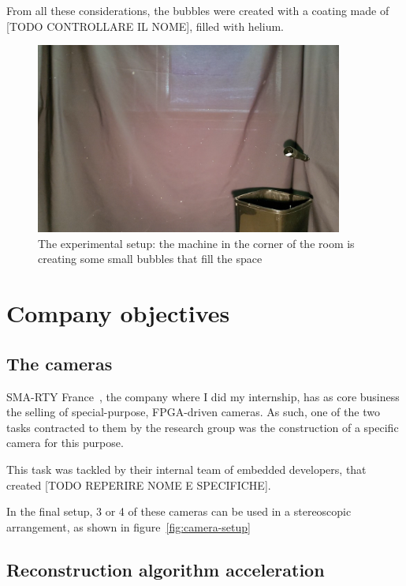 From all these considerations, the bubbles were created with a coating made of [TODO CONTROLLARE IL NOME], filled with helium.

\begin{figure}
	\centerline{\includegraphics[width=0.9\textwidth]{images/experimental-setup.png}}
	\caption{\centering The experimental setup: the machine in the corner of the room is creating some small bubbles that fill the space}
	\label{fig:experimetal-setup}
\end{figure}

\section{Company objectives}

\subsection{The cameras}

SMA-RTY France~\cite{smarty-website}, the company where I did my internship, has as core business the selling of special-purpose, FPGA-driven cameras.
As such, one of the two tasks contracted to them by the research group was the construction of a specific camera for this purpose.

This task was tackled by their internal team of embedded developers, that created [TODO REPERIRE NOME E SPECIFICHE].

In the final setup, 3 or 4 of these cameras can be used in a stereoscopic arrangement, as shown in figure~\ref{fig:camera-setup}

\subsection{Reconstruction algorithm acceleration}

